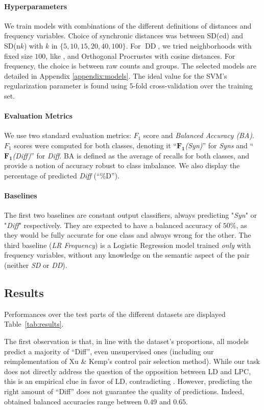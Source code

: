 \documentclass[11pt]{article}
\begin{document}
\paragraph{Hyperparameters}
We train models with combinations of the different definitions of distances and frequency variables. Choice of synchronic distances was between SD(cd) and SD(n$k$) with $k$ in $\{5,10,15,20,40,100\}$. For $\operatorname{DD}$, we tried neighborhoods with fixed size $100$, like \citet{xu-kemp-2015-evaluation}, and Orthogonal Procrustes with cosine distances. For frequency, the choice is between raw counts and groups. The selected models are detailed in Appendix \ref{appendix:models}. The ideal value for the SVM's regularization parameter is found using 5-fold cross-validation over the training set.

\paragraph{Evaluation Metrics}
We use two standard evaluation metrics: $F_1$ score and \textit{Balanced Accuracy (BA)}. 
$F_1$ scores were computed for both classes, denoting it ``$\mathbf{F_1}$\textit{(Syn)}'' for \textit{Syns} and ``$\mathbf{F_1}$\textit{(Diff)}'' for \textit{Diff}. BA is defined as the average of recalls for both classes, and provide a notion of accuracy robust to class imbalance. We also display the percentage of predicted \textit{Diff} (``\%D'').

\paragraph{Baselines}
The first two baselines are constant output classifiers, always predicting "\textit{Syn}" or "\textit{Diff}" respectively. They are expected to have a balanced accuracy of $50\%$, as they would be fully accurate for one class and always wrong for the other. The third baseline (\textit{LR Frequency}) is a Logistic Regression model trained \textit{only} with frequency variables, without any knowledge on the semantic aspect of the pair (neither \textit{SD} or \textit{DD}).

\subsection{Results}

Performances over the test parts of the different datasets are displayed Table~\ref{tab:results}.

The first observation is that, in line with the dataset's proportions, all models predict a majority of ``Diff'', even unsupervised ones (including our reimplementation of Xu \& Kemp's control pair selection method). While our task does not directly address the question of the opposition between LD and LPC, this is an empirical clue in favor of LD, contradicting \citet{xu-kemp-2015-evaluation}. However, predicting the right amount of ``Diff'' does not guarantee the quality of predictions. Indeed, obtained balanced accuracies range between $0.49$ and $0.65$. 
\end{document}
